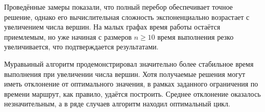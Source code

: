 Проведённые замеры показали, что полный перебор обеспечивает точное
решение, однако его вычислительная сложность экспоненциально возрастает с
увеличением числа вершин. На малых графах время работы остаётся приемлемым,
но уже начиная с размеров $n \ge 10$ время выполнения резко увеличивается,
что подтверждается результатами.

Муравьиный алгоритм продемонстрировал значительно более стабильное время
выполнения при увеличении числа вершин. Хотя получаемые решения могут иметь
отклонение от оптимального значения, в рамках заданного ограничения по
времени маршрут, как правило, удаётся построить. Среднее отклонение оказалось
незначительным, а в ряде случаев алгоритм находил оптимальный цикл.

\clearpage
